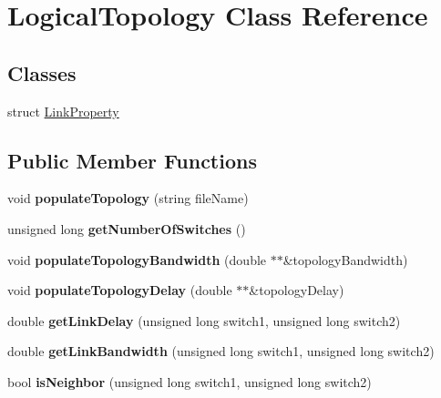 \hypertarget{classLogicalTopology}{\section{\-Logical\-Topology \-Class \-Reference}
\label{classLogicalTopology}
}
\subsection*{\-Classes}
\begin{DoxyCompactItemize}
\item 
struct \hyperlink{structLogicalTopology_1_1LinkProperty}{\-Link\-Property}
\end{DoxyCompactItemize}
\subsection*{\-Public \-Member \-Functions}
\begin{DoxyCompactItemize}
\item 
\hypertarget{classLogicalTopology_a3d7a08de5798c493654bd6e4ce597dbe}{void {\bfseries populate\-Topology} (string file\-Name)}\label{classLogicalTopology_a3d7a08de5798c493654bd6e4ce597dbe}

\item 
\hypertarget{classLogicalTopology_a403c4f7c4c7d929f5f7296367bba94ed}{unsigned long {\bfseries get\-Number\-Of\-Switches} ()}\label{classLogicalTopology_a403c4f7c4c7d929f5f7296367bba94ed}

\item 
\hypertarget{classLogicalTopology_a5148632f0606ec9ae936227b854c705d}{void {\bfseries populate\-Topology\-Bandwidth} (double $\ast$$\ast$\&topology\-Bandwidth)}\label{classLogicalTopology_a5148632f0606ec9ae936227b854c705d}

\item 
\hypertarget{classLogicalTopology_a9664b719a93c9e0d8ddf24694bfb2e37}{void {\bfseries populate\-Topology\-Delay} (double $\ast$$\ast$\&topology\-Delay)}\label{classLogicalTopology_a9664b719a93c9e0d8ddf24694bfb2e37}

\item 
\hypertarget{classLogicalTopology_a761afe128e64df07d199bc384351234b}{double {\bfseries get\-Link\-Delay} (unsigned long switch1, unsigned long switch2)}\label{classLogicalTopology_a761afe128e64df07d199bc384351234b}

\item 
\hypertarget{classLogicalTopology_a40a7f39a90d887efd7541ea529af50ee}{double {\bfseries get\-Link\-Bandwidth} (unsigned long switch1, unsigned long switch2)}\label{classLogicalTopology_a40a7f39a90d887efd7541ea529af50ee}

\item 
\hypertarget{classLogicalTopology_a0db7d55b5b52aa15546fc5d6f7579b2b}{bool {\bfseries is\-Neighbor} (unsigned long switch1, unsigned long switch2)}\label{classLogicalTopology_a0db7d55b5b52aa15546fc5d6f7579b2b}

\end{DoxyCompactItemize}
